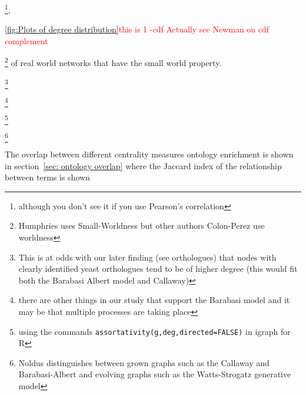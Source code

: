 \footnote{although you don't see it if you use Pearson's correlation},

\ref{fig:Plots of degree distribution}\textcolor{red}{this is 1 -cdf Actually see Newman on cdf complement}

\footnote{Humphries uses Small-Worldness but other authors Colon-Perez use worldness} of real world networks that have the small world property. 

\footnote{This is at odds with our later finding (see orthologues) that nodes with clearly identified yeast orthologues tend to be of higher degree (this would fit both the Barabasi Albert model and Callaway)} 


\footnote{there are other things in our study that support the Barabasi model and it may be that multiple processes are taking place}

\footnote{using the commands \texttt{assortativity(g,deg,directed=FALSE)} in igraph for R}

\footnote{Noldus distinguishes between grown graphs such as the Callaway and Barabasi-Albert and evolving graphs such as the Watts-Strogatz generative model}

The overlap between different centrality measures ontology enrichment is shown in section~\ref{sec: ontology overlap} where the Jaccard index of the relationship between terms is shown


